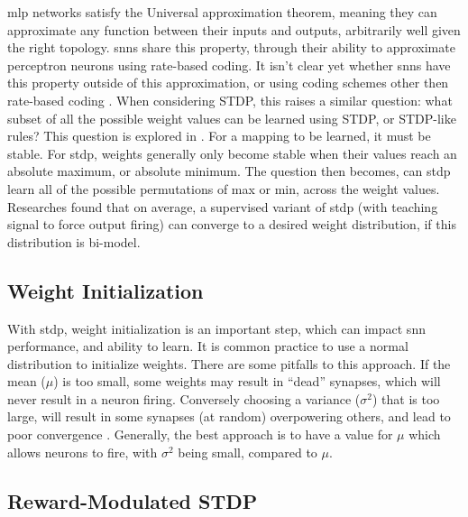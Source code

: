 

    \Gls{mlp} networks satisfy the Universal approximation theorem, meaning they
    can approximate any function between their inputs and outputs, arbitrarily
    well given the right topology. \Glspl{snn} share this property, through
    their ability to approximate perceptron neurons using rate-based coding. It
    isn't clear yet whether \glspl{snn} have this property outside of this
    approximation, or using coding schemes other then rate-based coding
    \parencite{legenstein_2005}. When considering STDP, this raises a similar
    question: what subset of all the possible weight values can be learned using
    STDP, or STDP-like rules? This question is explored in
    \parencite{legenstein_2005}. For a mapping to be learned, it must be
    stable. For \gls{stdp}, weights generally only become stable when their
    values reach an absolute maximum, or absolute minimum. The question then
    becomes, can \gls{stdp} learn all of the possible permutations of max or
    min, across the weight values. Researches found that on average, a
    supervised variant of \gls{stdp} (with teaching signal to force output
    firing) can converge to a desired weight distribution, if this distribution
    is bi-model.

    \subsection{Weight Initialization}
    
    With \gls{stdp}, weight initialization is an important step, which can
    impact \gls{snn} performance, and ability to learn. It is common practice to
    use a normal distribution to initialize weights. There are some pitfalls to
    this approach. If the mean ($\mu$) is too small, some weights may result in
    ``dead'' synapses, which will never result in a neuron firing. Conversely
    choosing a variance ($\sigma^2$) that is too large, will result in some
    synapses (at random) overpowering others, and lead to poor convergence
    \parencite{vigneron_2020}. Generally, the best approach is to have a value for
    $\mu$ which allows neurons to fire, with $\sigma^2$ being small, compared to
    $\mu$.

    \subsection{Reward-Modulated STDP}
    
